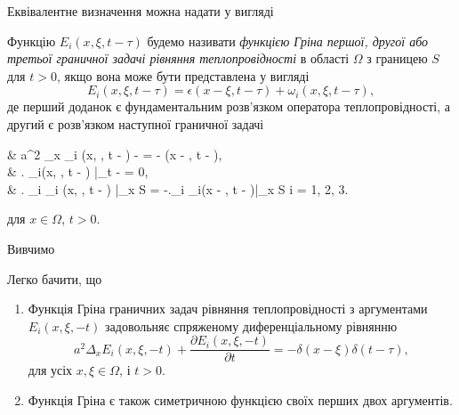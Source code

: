 Еквівалентне визначення можна надати у вигляді
\begin{definition}
	Функцію $E_i (x, \xi, t - \tau)$ будемо називати \textit{функцією Гріна першої, другої або третьої граничної задачі рівняння теплопровідності} в області $\Omega$ з границею $S$ для $t > 0$, якщо вона може бути представлена у вигляді
	\begin{equation}
		E_i(x, \xi, t - \tau) = \epsilon(x - \xi, t - \tau) + \omega_i(x, \xi, t - \tau),
	\end{equation}
	де  перший доданок є фундаментальним розв'язком оператора теплопровідності, а другий  є розв'язком наступної граничної задачі
	\begin{system}
		& a^2 \Delta_x \omega_i (x, \xi, t - \tau) -  = - \delta(x - \xi, t - \tau), \\
		& \left. \omega_i(x, \xi, t - \tau) \right|_{t - \tau {}} = 0, \\
		& \left. \ell_i \omega_i (x, \xi, t - \tau) \right|_{x \in S} = -\left.\ell_i \epsilon_i(x - \xi, t - \tau)\right|_{x \in S} \quad i = 1, 2, 3.
	\end{system}
	для $x \in \Omega$, $t > 0$.
\end{definition}

Вивчимо 
\begin{properties}
	Легко бачити, що 
	\begin{enumerate}
		\item Функція Гріна граничних задач рівняння теплопровідності з аргументами $E_i(x, \xi, -t)$ задовольняє спряженому диференціальному рівнянню
		\begin{equation}
			a^2 \Delta_x E_i(x, \xi, -t) + \frac{\partial E_i(x, \xi, - t)}{\partial t} = - \delta(x - \xi) \delta (t - \tau), 
		\end{equation}
		для усіх $x, \xi \in \Omega$, і $t > 0$.
		\item Функція Гріна є також симетричною функцією своїх перших двох аргументів.
	\end{enumerate}
\end{properties}
	
